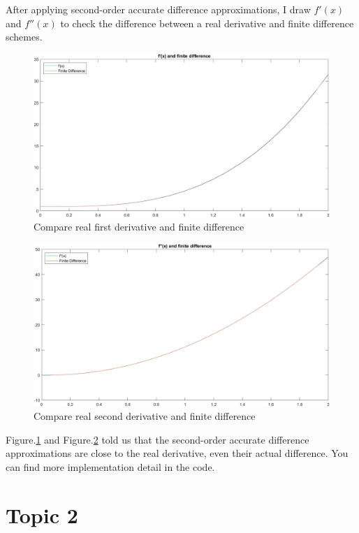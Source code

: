 \documentclass[
	12pt, %
]{fphw}
\numberwithin{equation}{section}
\numberwithin{figure}{section}
\numberwithin{table}{section}
\begin{document}
After applying second-order accurate difference approximations, I draw $f'(x)$ and $f''(x)$ to check the difference between a real derivative and finite difference schemes.

\begin{figure}[h!]
	\centering
	\includegraphics[width=0.8\columnwidth]{img/f'(x).png} %
	\caption{Compare real first derivative and finite difference}
	\label{fig:f'(x)}
\end{figure}

\begin{figure}[h!]
	\centering
	\includegraphics[width=0.8\columnwidth]{img/f''(x).png} %
	\caption{Compare real second derivative and finite difference}
	\label{fig:f''(x)}
\end{figure}


Figure.\ref{fig:f'(x)} and Figure.\ref{fig:f''(x)} told us that the second-order accurate difference approximations are close to the real derivative, even their actual difference. You can find more implementation detail in the code.


\section{Topic 2}
\end{document}
